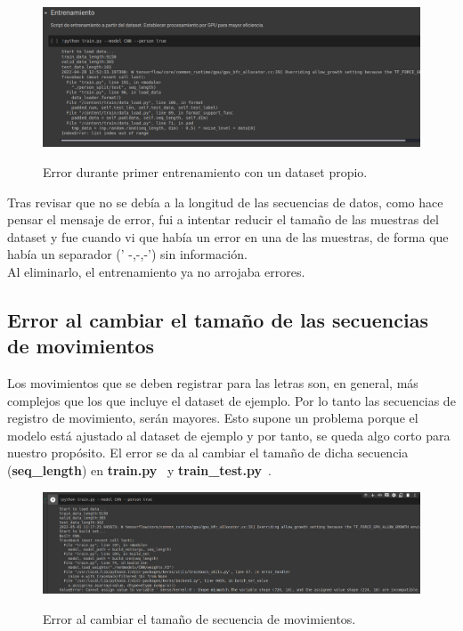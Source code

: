 \begin{mimargen}{-1cm}{-1cm}
\begin{figure}[h]
    \centering
    \includegraphics[width=1\textwidth]{capturas/ErrorEntrenamiento.png}\\[-0,40cm]
    \caption{Error durante primer entrenamiento con un dataset propio.}
    \end{figure}

Tras revisar que no se debía a la longitud de las secuencias de datos,
como hace pensar el mensaje de error, fui a intentar reducir el tamaño de las
muestras del dataset y fue cuando vi que había un error en una de las muestras,
de forma que había un separador (' -,-,-') sin información.\\
Al eliminarlo, el entrenamiento ya no arrojaba errores.


\subsection{Error al cambiar el tamaño de las secuencias de movimientos}
Los movimientos que se deben registrar para las letras son, en general, más complejos
que los que incluye el dataset de ejemplo. Por lo tanto las secuencias de registro
de movimiento, serán mayores. Esto supone un problema porque el modelo está ajustado
al dataset de ejemplo y por tanto, se queda algo corto para nuestro propósito.
El error se da al cambiar el tamaño de dicha secuencia
(\small\textbf{seq\_length}\normalsize) en \small\textbf{train.py}\normalsize~ y
\small\textbf{train\_test.py}\normalsize~.

\begin{figure}[h]
    \centering
    \includegraphics[width=1\textwidth]{capturas/ErrorTamanioSecuencias.png}\\[-0,40cm]
    \caption{Error al cambiar el tamaño de secuencia de movimientos.}
    \end{figure}


\end{mimargen}

